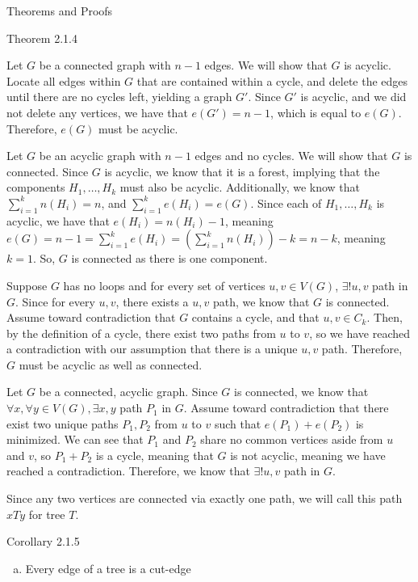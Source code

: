 \documentclass[10pt]{extarticle}
\begin{document}
\begin{problem}{Theorems and Proofs}
\begin{problem}{Theorem 2.1.4}
\begin{description}[font=\normalfont]
    \item[(b) $\rightarrow$ \{(a),(c)\}:]
      Let $G$ be a connected graph with $n-1$ edges. We will show that $G$ is acyclic. Locate all edges within $G$ that are contained within a cycle, and delete the edges until there are no cycles left, yielding a graph $G'$. Since $G'$ is acyclic, and we did not delete any vertices, we have that $e(G') = n-1$, which is equal to $e(G)$. Therefore, $e(G)$ must be acyclic.
    \item[(c) $\rightarrow$ \{(a),(b)\}:]
      Let $G$ be an acyclic graph with $n-1$ edges and no cycles. We will show that $G$ is connected. Since $G$ is acyclic, we know that it is a forest, implying that the components $H_1,\dots,H_k$ must also be acyclic. Additionally, we know that $\sum_{i = 1}^{k} n(H_i) = n$, and $\sum_{i = 1}^{k} e(H_i) = e(G)$. Since each of $H_1,\dots,H_k$ is acyclic, we have that $e(H_i) = n(H_i) - 1$, meaning $e(G) = n-1 = \sum_{i = 1}^{k} e(H_i) = \left(\sum_{i = 1}^{k} n(H_i)\right) - k = n - k$, meaning $k = 1$. So, $G$ is connected as there is one component.
    \item[(a) $\rightarrow$ (d):]
      Suppose $G$ has no loops and for every set of vertices $u,v\in V(G)$, $\exists!u,v$ path in $G$. Since for every $u,v$, there exists a $u,v$ path, we know that $G$ is connected. Assume toward contradiction that $G$ contains a cycle, and that $u,v\in C_k$. Then, by the definition of a cycle, there exist two paths from $u$ to $v$, so we have reached a contradiction with our assumption that there is a unique $u,v$ path. Therefore, $G$ must be acyclic as well as connected.
    \item[(d) $\rightarrow$ (a):]
      Let $G$ be a connected, acyclic graph. Since $G$ is connected, we know that $\forall x, \forall y\in V(G), \exists x,y$ path $P_1$ in $G$. Assume toward contradiction that there exist two unique paths $P_1, P_2$ from $u$ to $v$ such that $e(P_1) + e(P_2)$ is minimized. We can see that $P_1$ and $P_2$ share no common vertices aside from $u$ and $v$, so $P_1 + P_2$ is a cycle, meaning that $G$ is not acyclic, meaning we have reached a contradiction. Therefore, we know that $\exists! u,v$ path in $G$.
    \end{description}
  \end{problem}
  Since any two vertices are connected via exactly one path, we will call this path $xTy$ for tree $T$.
  \begin{problem}{Corollary 2.1.5}
    \begin{enumerate}[(a)]
      \item Every edge of a tree is a cut-edge

\end{enumerate}
\end{problem}
\end{problem}
\end{document}
